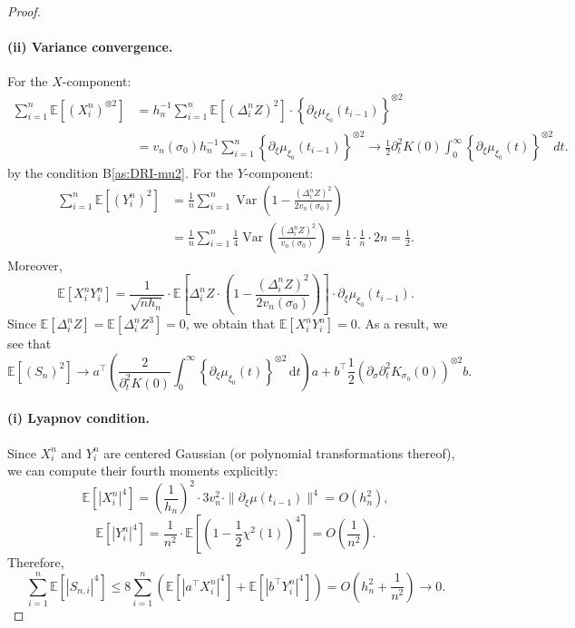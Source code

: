 \documentclass[a4paper,10pt,twoside]{article}
\numberwithin{equation}{section}
\def\l{\left}
\def\r{\right}
\def\s{\sigma}
\def\E{\mathbb{E}}
\def\df{\mathrm{d}}
\begin{document}
\begin{proof}
\paragraph{(ii) Variance convergence.}
For the $X$-component:
\begin{align*}
\sum_{i=1}^n \E[(X_i^n)^{\otimes 2}] &= h_n^{-1}\sum_{i=1}^n \E[(\Delta_i^n Z)^2] \cdot \l\{ \partial_\xi \mu_{\xi_0}(t_{i-1}) \r\}^{\otimes 2} \\
&= v_n(\sigma_0) h_n^{-1}\sum_{i=1}^n \l\{ \partial_\xi \mu_{\xi_0}(t_{i-1}) \r\}^{\otimes 2} \to \frac{1}{2} \partial_t^2 K(0) \int_0^\infty \l\{ \partial_\xi \mu_{\xi_0}(t) \r\}^{\otimes 2} dt.
\end{align*}
by the condition B\ref{as:DRI-mu2}. 
For the $Y$-component:
\begin{align*}
\sum_{i=1}^n \E[(Y_i^n)^2] &= \frac{1}{n} \sum_{i=1}^n \operatorname{Var}\l( 1 - \frac{(\Delta_i^n Z)^2}{2 v_n(\sigma_0)} \r) \\
&= \frac{1}{n} \sum_{i=1}^n \frac{1}{4} \operatorname{Var}\l( \frac{(\Delta_i^n Z)^2}{v_n(\sigma_0)} \r) = \frac{1}{4} \cdot \frac{1}{n} \cdot 2n = \frac{1}{2}.
\end{align*}
Moreover, 
\[
\E[X_i^n Y_i^n] = \frac{1}{\sqrt{n h_n}} \cdot \E\l[ \Delta_i^n Z \cdot \l( 1 - \frac{(\Delta_i^n Z)^2}{2 v_n(\sigma_0)} \r) \r] \cdot \partial_\xi \mu_{\xi_0}(t_{i-1}).
\]
Since $\E[\Delta_i^n Z] = \E[\Delta_i^n Z^3] =0$, we obtain that $\E[X_i^n Y_i^n] = 0$.
As a result, we see that 
\[
\E[(S_n)^2] \to a^\top \l(\frac{2}{\partial_t^2 K(0)}  \int_0^\infty \l\{ \partial_\xi \mu_{\xi_0}(t) \r\}^{\otimes 2}\,\df t\r) a + b^\top \frac{1}{2}\l(\partial_\sigma \partial_t^2 K_{\s_0}(0)\r)^{\otimes 2} b. 
\]

\paragraph{(i) Lyapnov condition.}
Since $X_i^n$ and $Y_i^n$ are centered Gaussian (or polynomial transformations thereof), we can compute their fourth moments explicitly:
\[
\E[|X_i^n|^4] = \l( \frac{1}{h_n} \r)^2 \cdot 3 v_n^2 \cdot \|\partial_\xi \mu(t_{i-1})\|^4 = O\l( h_n^2\r),
\]
\[
\E[|Y_i^n|^4] = \frac{1}{n^2} \cdot \E\l[ \l(1 - \frac{1}{2} \chi^2(1) \r)^4 \r] = O\l( \frac{1}{n^2} \r).
\]
Therefore,
\[
\sum_{i=1}^n \E[|S_{n,i}|^4] \le 8 \sum_{i=1}^n \l( \E[|a^\top X_i^n|^4] + \E[|b^\top Y_i^n|^4] \r) = O\l(h_n^2 +  \frac{1}{n^2} \r) \to 0.
\]

\end{proof}
\end{document}
